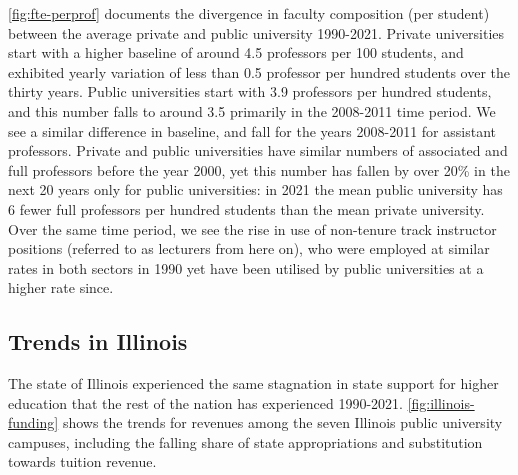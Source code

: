 \documentclass[notitlepage,12pt]{article}
\begin{document}
\autoref{fig:fte-perprof} documents the divergence in faculty composition (per student) between the average private and public university 1990-2021.
Private universities start with  a higher baseline of around 4.5 professors per 100 students, and exhibited yearly variation of less than 0.5 professor per hundred students over the thirty years.
Public universities start with 3.9 professors per hundred students, and this number falls to around 3.5 primarily in the 2008-2011 time period.
We see a similar difference in baseline, and fall for the years 2008-2011 for assistant professors.
Private and public universities have similar numbers of associated and full professors before the year 2000, yet this number has fallen by over 20\% in the next 20 years only for public universities: in 2021 the mean public university has 6 fewer full professors per hundred students than the mean private university.
Over the same time period, we see the rise in use of non-tenure track instructor positions (referred to as lecturers from here on), who were employed at similar rates in both sectors in 1990 yet have been utilised by public universities at a higher rate since.

\subsection{Trends in Illinois}
\label{sec:trends-illinois}

The state of Illinois experienced the same stagnation in state support for higher education that the rest of the nation has experienced 1990-2021.
\autoref{fig:illinois-funding} shows the trends for revenues among the seven Illinois public university campuses, including the falling share of state appropriations and substitution towards tuition revenue.
\end{document}
